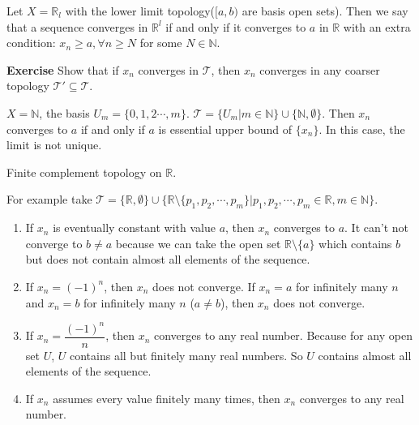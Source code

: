 \documentclass[main.tex]{subfiles}
\begin{document}
\begin{example}
    Let $X = \mathbb{R}_l$ with the lower limit topology($[a, b)$ are basis open sets). Then we say that a sequence converges in $\mathbb{R}^l$ if and only if it converges to $a$ in $\mathbb{R}$ with an extra condition: $x_n \ge a, \forall n \ge N$ for some $N\in \mathbb{N}$.  
\end{example}

\par \noindent \textbf{Exercise} Show that if $x_n$ converges in $\mathcal{T}$, then $x_n$ converges in any coarser topology $\mathcal{T}' \subseteq \mathcal{T}$.

\begin{example}
    $X = \mathbb{N}$, the basis $U_m = \{0, 1, 2 \cdots, m\}$. $\mathcal{T} = \{U_m | m\in \mathbb{N}\}\cup \{ \mathbb{N}, \emptyset\}$. Then $x_n$ converges to $a$ if and only if $a$ is essential upper bound of $\{ x_n \}$. In this case, the limit is not unique. 
\end{example}

\begin{example}
    Finite complement topology on $\mathbb{R}$. 
    \par For example take $\mathcal{T} = \{ \mathbb{R}, \emptyset\}\cup \{ \mathbb{R}\setminus \{p_1, p_2, \cdots, p_m\}| p_1, p_2, \cdots, p_m \in \mathbb{R}, m \in \mathbb{N}\}$. 
    \begin{enumerate}
        \item If $x_n$ is eventually constant with value $a$, then $x_n$ converges to $a$. It can't not converge to $b \neq a$ because we can take the open set $\mathbb{R} \setminus \{a\}$ which contains $b$ but does not contain almost all elements of the sequence.
        \item If $x_n = (- 1)^n$, then $x_n$ does not converge. If $x_n = a$ for infinitely many $n$ and $x_n = b$ for infinitely many $n$ ($a \neq b$), then $x_n$ does not converge. 
        \item If $x_n = \dfrac{(-1)^n}{n}$, then $x_n$ converges to any real number. Because for any open set $U$, $U$ contains all but finitely many real numbers. So $U$ contains almost all elements of the sequence. 
        \item If $x_n$ assumes every value finitely many times, then $x_n$ converges to any real number.  
    \end{enumerate}
\end{example}
\end{document}
